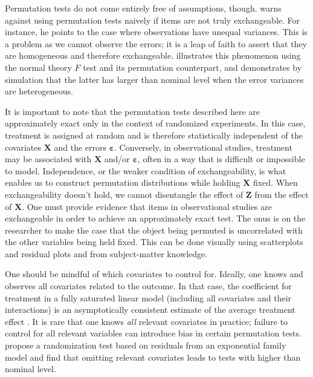 \documentclass[12pt]{article}
\begin{document}
Permutation tests do not come entirely free of assumptions, though.  
\cite{romano_behavior_1990} warns against using permutation tests naively if items are not truly exchangeable. 
For instance, he points to the case where observations have unequal variances.  
This is a problem as we cannot observe the errors; it is a leap of faith to assert that they are homogeneous and therefore exchangeable.
\cite{boik_fisherpitman_1987} illustrates this phenomenon using the normal theory $F$ test and its permutation counterpart, 
and demonstrates by simulation that the latter has larger than nominal level when the error variances are heterogeneous.

It is important to note that the permutation tests described here are approximately exact only in the context of randomized experiments.
In this case, treatment is assigned at random and is therefore statistically independent of the covariates $\mathbf{X}$ and the errors $\mathbf{\varepsilon}$.
Conversely, in observational studies, treatment may be associated with $\mathbf{X}$ and/or $\mathbf{\varepsilon}$, often in a way that is difficult or impossible to model.
Independence, or the weaker condition of exchangeability, is what enables us to construct permutation distributions while holding $\mathbf{X}$ fixed.
When exchangeability doesn't hold, we cannot disentangle the effect of $\mathbf{Z}$ from the effect of $\mathbf{X}$.
One must provide evidence that items in observational studies are exchangeable in order to achieve an approximately exact test.
The onus is on the researcher to make the case that the object being permuted is uncorrelated with the other variables being held fixed.
This can be done visually using scatterplots and residual plots \cite{freedman_nonstochastic_1983} and from subject-matter knowledge.

One should be mindful of which covariates to control for.
Ideally, one knows and observes all covariates related to the outcome.
In that case, the coefficient for treatment in a fully saturated linear model (including all covariates and their interactions) is an asymptotically consistent estimate of the average treatment effect \cite{lin_agnostic_2013}.
It is rare that one knows \textit{all} relevant covariates in practice; failure to control for all relevant variables can introduce bias in certain permutation tests.
 \cite{gail_tests_1988} propose a randomization test based on residuals from an exponential family model and find that omitting relevant covariates leads to tests with higher than nominal level.
 
\end{document}
